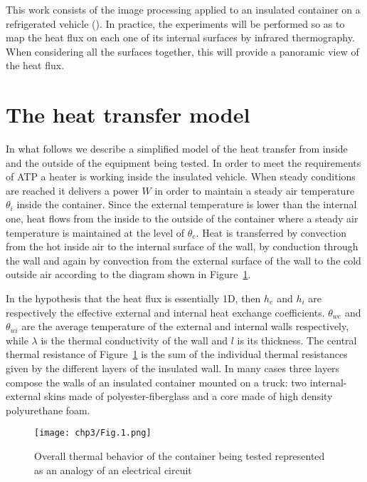 This work consists of the image processing applied to an insulated container on a refrigerated vehicle (\citet{bison1993automatic,bison2012geometrical}). In practice, the experiments will be performed so as to map the heat flux on each one of its internal surfaces by infrared thermography. When considering all the surfaces together, this will provide a panoramic view of the heat flux.


\section{The heat transfer model}

In what follows we describe a simplified model of the heat transfer from inside and the outside of the equipment being tested. In order to meet the requirements of ATP a heater is working inside the insulated vehicle. When steady conditions are reached it delivers a power $ W $ in order to maintain a steady air temperature $ \theta_i $ inside the container. Since the external temperature is lower than the internal one, heat flows from the inside to the outside of the container where a steady air temperature is maintained at the level of $ \theta_e $. Heat is transferred by convection from the hot inside air to the internal surface of the wall, by conduction through the wall and again by convection from the external surface of the wall to the cold outside air according to the diagram shown in Figure~\ref{Therm_Res}. 

In the hypothesis that the heat flux is essentially 1D,  then $ h_e $ and $ h_i $ are respectively the effective external and internal heat exchange coefficients. $ \theta_{we} $ and $ \theta_{wi} $ are the average temperature of the external and internal walls respectively, while $\lambda $ is the thermal conductivity of the wall and $l$ is its thickness. The central thermal resistance of Figure~\ref{Therm_Res} is the sum of the individual thermal resistances given by the different layers of the insulated wall. In many cases three layers compose the walls of an insulated container mounted on a truck: two internal-external skins made of polyester-fiberglass and a core made of high density polyurethane foam.
\begin{figure}[ht]
    \centering
    \texttt{[image: chp3/Fig.1.png]}
    \caption{Overall thermal behavior of the container being tested represented as an analogy of an electrical circuit}
    \label{Therm_Res}
\end{figure}


